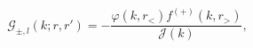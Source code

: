 \begin{equation}
\label{Eq_0209}
\mathcal{G}_{\pm,l}(k;r,r')
	= - \frac{\varphi(k, r_{<}) f^{(+)}(k, r_{>})}{\mathcal{J}(k)},
\end{equation}

